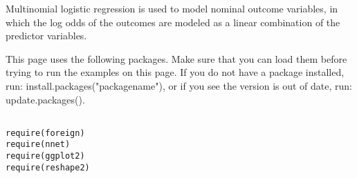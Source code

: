 \documentclass[00-GLMregslides.tex]{subfiles}
\begin{document}
	

	
\begin{frame}
\Large
	


Multinomial logistic regression is used to model nominal outcome variables, in which the log odds of the outcomes are modeled as a linear combination of the predictor variables.

 
\end{frame}

\begin{frame}[fragile]

This page uses the following packages. Make sure that you can load them before trying to run the examples on this page. If you do not have a package installed, run: install.packages("packagename"), or if you see the version is out of date, run: update.packages().

\begin{framed}
\begin{verbatim}

require(foreign)
require(nnet)
require(ggplot2)
require(reshape2)
\end{verbatim}
\end{framed}



\end{frame}
\end{document}
